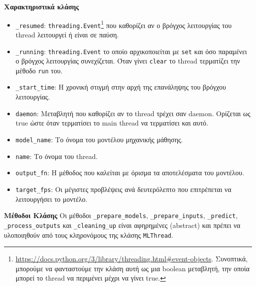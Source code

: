 \noindent\textbf{Χαρακτηριστικά κλάσης}
\begin{itemize}
	\item \texttt{\_resumed}: \texttt{threading.Event}\footnote{\href{https://docs.python.org/3/library/threading.html\#event-objects}{https://docs.python.org/3/library/threading.html\#event-objects}. Συνοπτικά, μπορούμε να φανταστούμε την κλάση αυτή ως μια boolean μεταβλητή, την οποία μπορεί το thread να περιμένει μέχρι να γίνει true.} που καθορίζει αν ο βρόγχος λειτουργίας του thread λειτουργεί ή είναι σε παύση.
	\item \texttt{\_running}: \texttt{threading.Event} το οποίο αρχικοποιείται με \texttt{set} και όσο παραμένει ο βρόγχος λειτουργίας συνεχίζεται. Όταν γίνει \texttt{clear} το thread τερματίζει την μέθοδο \texttt{run} του.
	\item \texttt{\_start\_time}: Η χρονική στιγμή στην αρχή της επανάληψης του βρόγχου λειτουργίας.
	\item \texttt{daemon}: Μεταβλητή που καθορίζει αν το thread τρέχει σαν daemon. Ορίζεται ως true ώστε όταν τερματίσει το main thread να τερματίσει και αυτό.
	\item \texttt{model\_name}: Το όνομα του μοντέλου μηχανικής μάθησης.
	\item \texttt{name}: Το όνομα του thread.
	\item \texttt{output\_fn}: Η μέθοδος που καλείται με όρισμα τα αποτελέσματα του μοντέλου.
	\item \texttt{target\_fps}: Οι μέγιστες προβλέψεις ανά δευτερόλεπτο που επιτρέπεται να λειτουργήσει το μοντέλο.
\end{itemize}

\noindent\textbf{Μέθοδοι Κλάσης}
Οι μέθοδοι \texttt{\_prepare\_models}, \texttt{\_prepare\_inputs}, \texttt{\_predict}, \texttt{\_process\_outputs} και \texttt{\_cleaning\_up} είναι αφηρημένες (abstract) και πρέπει να υλοποιηθούν από τους κληρονόμους της κλάσης \texttt{MLThread}.


